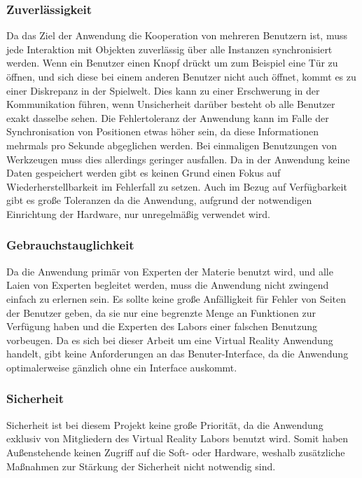 \subsubsection*{Zuverlässigkeit}
Da das Ziel der Anwendung die Kooperation von mehreren Benutzern ist, muss jede Interaktion mit Objekten zuverlässig über alle Instanzen synchronisiert werden. Wenn ein Benutzer einen Knopf drückt um zum Beispiel eine Tür zu öffnen, und sich diese bei einem anderen Benutzer nicht auch öffnet, kommt es zu einer Diskrepanz in der Spielwelt. Dies kann zu einer Erschwerung in der Kommunikation führen, wenn Unsicherheit darüber besteht ob alle Benutzer exakt dasselbe sehen. Die Fehlertoleranz der Anwendung kann im Falle der Synchronisation von Positionen etwas höher sein, da diese Informationen mehrmals pro Sekunde abgeglichen werden. Bei einmaligen Benutzungen von Werkzeugen muss dies allerdings geringer ausfallen.
Da in der Anwendung keine Daten gespeichert werden gibt es keinen Grund einen Fokus auf Wiederherstellbarkeit im Fehlerfall zu setzen. Auch im Bezug auf Verfügbarkeit gibt es große Toleranzen da die Anwendung, aufgrund der notwendigen Einrichtung der Hardware, nur unregelmäßig verwendet wird.

\subsubsection*{Gebrauchstauglichkeit}
Da die Anwendung primär von Experten der Materie benutzt wird, und alle Laien von Experten begleitet werden, muss die Anwendung nicht zwingend einfach zu erlernen sein. Es sollte keine große Anfälligkeit für Fehler von Seiten der Benutzer geben, da sie nur eine begrenzte Menge an Funktionen zur Verfügung haben und die Experten des Labors einer falschen Benutzung vorbeugen. Da es sich bei dieser Arbeit um eine Virtual Reality Anwendung handelt, gibt keine Anforderungen an das Benuter-Interface, da die Anwendung optimalerweise gänzlich ohne ein Interface auskommt. 

\subsubsection*{Sicherheit}
Sicherheit ist bei diesem Projekt keine große Priorität, da die Anwendung exklusiv von Mitgliedern des Virtual Reality Labors benutzt wird. Somit haben Außenstehende keinen Zugriff auf die Soft- oder Hardware, weshalb zusätzliche Maßnahmen zur Stärkung der Sicherheit nicht notwendig sind.

\newpage

